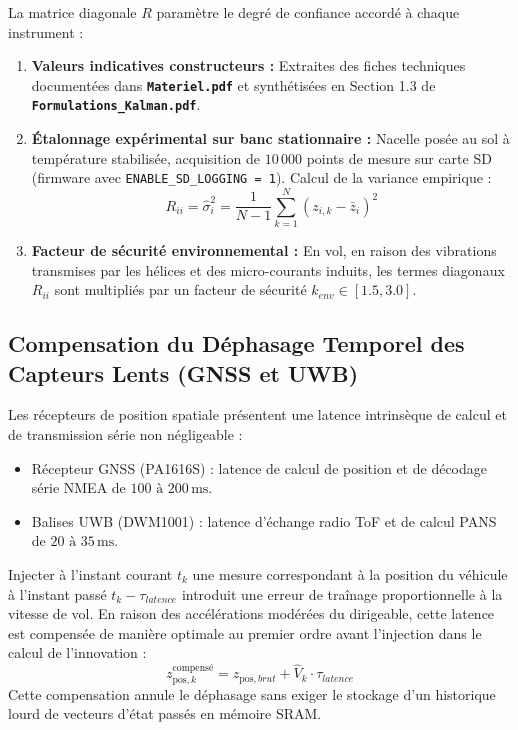 \documentclass[../Implementation.tex]{subfiles}
\begin{document}
La matrice diagonale $R$ paramètre le degré de confiance accordé à chaque instrument :
\begin{enumerate}
    \item \textbf{Valeurs indicatives constructeurs :}
    Extraites des fiches techniques documentées dans \textbf{\texttt{Materiel.pdf}} et synthétisées en Section 1.3 de \textbf{\texttt{Formulations\_Kalman.pdf}}.
    \item \textbf{Étalonnage expérimental sur banc stationnaire :}
    Nacelle posée au sol à température stabilisée, acquisition de $10\,000$ points de mesure sur carte SD (firmware avec \lstinline|ENABLE_SD_LOGGING = 1|). Calcul de la variance empirique :
    \begin{equation}
        R_{ii} = \hat{\sigma}_i^2 = \frac{1}{N-1}\sum_{k=1}^N (z_{i,k} - \bar{z}_i)^2
    \end{equation}
    \item \textbf{Facteur de sécurité environnemental :}
    En vol, en raison des vibrations transmises par les hélices et des micro-courants induits, les termes diagonaux $R_{ii}$ sont multipliés par un facteur de sécurité $k_{env} \in [1.5, 3.0]$.
\end{enumerate}

\subsection{Compensation du Déphasage Temporel des Capteurs Lents (GNSS et UWB)}

Les récepteurs de position spatiale présentent une latence intrinsèque de calcul et de transmission série non négligeable :
\begin{itemize}
    \item Récepteur GNSS (PA1616S) : latence de calcul de position et de décodage série NMEA de $100\text{ à }200\,\text{ms}$.
    \item Balises UWB (DWM1001) : latence d'échange radio ToF et de calcul PANS de $20\text{ à }35\,\text{ms}$.
\end{itemize}

Injecter à l'instant courant $t_k$ une mesure correspondant à la position du véhicule à l'instant passé $t_k - \tau_{latence}$ introduit une erreur de traînage proportionnelle à la vitesse de vol. En raison des accélérations modérées du dirigeable, cette latence est compensée de manière optimale au premier ordre avant l'injection dans le calcul de l'innovation :
\begin{equation}
    z_{\text{pos}, k}^{\text{compensé}} = z_{\text{pos}, brut} + \hat{V}_k \cdot \tau_{latence}
\end{equation}
Cette compensation annule le déphasage sans exiger le stockage d'un historique lourd de vecteurs d'état passés en mémoire SRAM.
\end{document}
